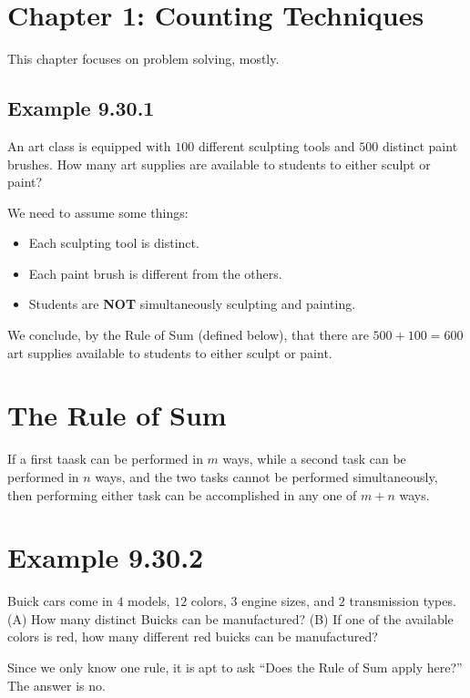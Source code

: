 \documentclass{article}
\begin{document}
\section*{Chapter 1: Counting Techniques}

This chapter focuses on problem solving, mostly.

\subsection*{Example 9.30.1}

An art class is equipped with $100$ different sculpting tools and
$500$ distinct paint brushes. How many art supplies are available to
students to either sculpt or paint?

We need to assume some things:

\begin{itemize}
\item Each sculpting tool is distinct.
\item Each paint brush is different from the others.
\item Students are \textbf{NOT} simultaneously sculpting and painting.
\end{itemize}

We conclude, by the Rule of Sum (defined below), that there are
$500+100=600$ art supplies available to students to either sculpt or
paint.

\section*{The Rule of Sum}

If a first taask can be performed in $m$ ways, while a second task can
be performed in $n$ ways, and the two tasks cannot be performed
simultaneously, then performing either task can be accomplished in any
one of $m+n$ ways.

\section*{Example 9.30.2}

Buick cars come in $4$ models, $12$ colors, $3$ engine sizes, and $2$
transmission types. (A) How many distinct Buicks can be manufactured?
(B) If one of the available colors is red, how many different red
buicks can be manufactured?

Since we only know one rule, it is apt to ask ``Does the Rule of Sum
apply here?'' The answer is no.
\end{document}

